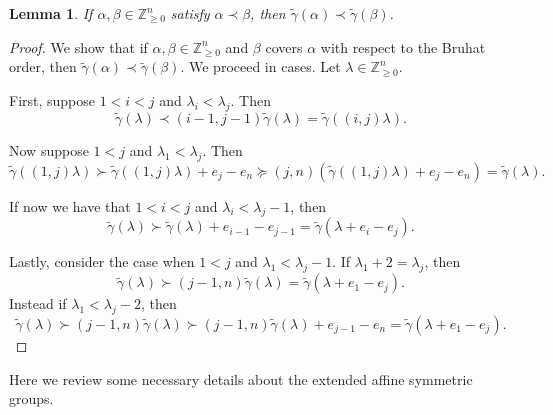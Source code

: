 \documentclass[10pt,a4paper]{amsart}
\numberwithin{equation}{section}
\newtheorem{Lemma}[Theorem]{Lemma}
\theoremstyle{definition}
\begin{document}
\begin{Lemma}\label{gamma preserves Bruhat}
 If $\alpha, \beta \in \mathbb{Z}^n_{\geq 0}$ satisfy $\alpha \prec \beta$, then $\widetilde{\gamma}(\alpha) \prec \widetilde{\gamma}(\beta)$.
\end{Lemma}
\begin{proof}
 We show that if $\alpha, \beta \in \mathbb{Z}_{\geq 0}^{n}$ and $\beta$ covers $\alpha$ with respect to the Bruhat order, then $\widetilde{\gamma}(\alpha) \prec \widetilde{\gamma}(\beta)$. We proceed in cases. Let $\lambda \in \mathbb{Z}_{\geq 0}^{n}$.

 First, suppose $1<i<j$ and $\lambda_i < \lambda_j$. Then
\[\widetilde{\gamma}(\lambda) \prec (i-1,j-1)\widetilde{\gamma}(\lambda) = \widetilde{\gamma}( (i,j) \lambda).\]

 Now suppose $1<j$ and $\lambda_1 < \lambda_j$. Then
 \[
 \widetilde{\gamma}( (1,j)\lambda) \succ \widetilde{\gamma}( (1,j)\lambda) + e_j - e_n \succeq (j,n)(\widetilde{\gamma}( (1,j)\lambda) + e_j - e_n) = \widetilde{\gamma}(\lambda).
 \]


 If now we have that $1<i<j$ and $\lambda_i < \lambda_j -1$, then
 \[
 \widetilde{\gamma}(\lambda) \succ \widetilde{\gamma}(\lambda) + e_{i-1}-e_{j-1} = \widetilde{\gamma}(\lambda + e_{i}-e_{j}).
 \]

 Lastly, consider the case when $1 < j$ and $\lambda_1 < \lambda_j -1$. If $\lambda_1 + 2 = \lambda_j$, then
 \[
 \widetilde{\gamma}(\lambda) \succ (j-1,n)\widetilde{\gamma}(\lambda) = \widetilde{\gamma}(\lambda + e_1 - e_j).
 \]
 Instead if $\lambda_1 < \lambda_j -2$, then
 \[
 \widetilde{\gamma}(\lambda) \succ (j-1,n)\widetilde{\gamma}(\lambda) \succ (j-1,n) \widetilde{\gamma}(\lambda) + e_{j-1}-e_n = \widetilde{\gamma}(\lambda+e_1-e_j).\tag*{\qed}
 \] \renewcommand{\qed}{}
\end{proof}

Here we review some necessary details about the extended affine symmetric groups.
\end{document}
